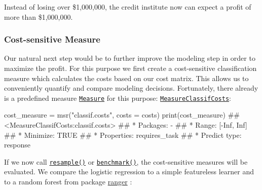 \documentclass[]{article}
\newenvironment{Shaded}{}{}
\newcommand{\DataTypeTok}[1]{#1}
\newcommand{\KeywordTok}[1]{\textcolor[rgb]{0.00,0.00,1.00}{#1}}
\newcommand{\NormalTok}[1]{#1}
\newcommand{\StringTok}[1]{\textcolor[rgb]{0.00,0.50,0.50}{#1}}
\renewenvironment{Shaded} {\begin{snugshade}\small} {\end{snugshade}}
\begin{document}
Instead of losing over \$1,000,000, the credit institute now can expect a profit of more than \$1,000,000.

\hypertarget{cost-sensitive-measure}{%
\subsubsection{Cost-sensitive Measure}\label{cost-sensitive-measure}}

Our natural next step would be to further improve the modeling step in order to maximize the profit.
For this purpose we first create a cost-sensitive classification measure which calculates the costs based on our cost matrix.
This allows us to conveniently quantify and compare modeling decisions.
Fortunately, there already is a predefined measure \href{https://mlr3.mlr-org.com/reference/Measure.html}{\texttt{Measure}} for this purpose: \href{https://mlr3.mlr-org.com/reference/mlr_measures_classif.costs.html}{\texttt{MeasureClassifCosts}}:

\begin{Shaded}
\begin{Highlighting}[]
\NormalTok{cost_measure =}\StringTok{ }\KeywordTok{msr}\NormalTok{(}\StringTok{"classif.costs"}\NormalTok{, }\DataTypeTok{costs =}\NormalTok{ costs)}
\KeywordTok{print}\NormalTok{(cost_measure)}
\NormalTok{## <MeasureClassifCosts:classif.costs>}
\NormalTok{## * Packages: -}
\NormalTok{## * Range: [-Inf, Inf]}
\NormalTok{## * Minimize: TRUE}
\NormalTok{## * Properties: requires_task}
\NormalTok{## * Predict type: response}
\end{Highlighting}
\end{Shaded}

If we now call \href{https://mlr3.mlr-org.com/reference/resample.html}{\texttt{resample()}} or \href{https://mlr3.mlr-org.com/reference/benchmark.html}{\texttt{benchmark()}}, the cost-sensitive measures will be evaluated.
We compare the logistic regression to a simple featureless learner and to a random forest from package \href{https://cran.r-project.org/package=ranger}{ranger} :
\end{document}

